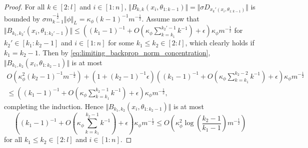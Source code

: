 \documentclass[twoside,11pt]{article}
\begin{document}
\begin{proof}
For all $k \in [2:l]$ and $i \in [1:n]$, $\Vert B_{k,k}(x_i,\theta_{1:k-1}) \Vert = \Vert \sigma D_{x_k'(x_i,\theta_{1:k-1})} \Vert$ is bounded by $\sigma m_{k-1}^{-\frac{1}{2}} \Vert \phi \Vert_L = \kappa_\phi (k-1)^{-1} m^{-\frac{1}{2}}$. Assume now that $\Vert B_{k_1,k_2'}(x_i,\theta_{1:k_2'-1}) \Vert \leq ((k_1-1)^{-1} + O(\kappa_\phi \sum_{k=k_1}^{k_2'-1} k^{-1}) + \epsilon) \kappa_\phi m^{-\frac{1}{2}}$ for $k_2' \in [k_1:k_2-1]$ and $i \in [1:n]$ for some $k_1 \leq k_2 \in [2:l]$, which clearly holds if $k_1=k_2-1$. Then by \eqref{eq:limiting_backprop_norm_concentration}, $\Vert B_{k_1,k_2}(x_i,\theta_{1:k_2-1}) \Vert$ is at most
\begin{multline*}
O(\kappa_\phi^2 (k_2-1)^{-1} m^{-\frac{1}{2}}) + (1 + (k_2-1)^{-1} \epsilon) \left( (k_1-1)^{-1} + O\left( \kappa_\phi \sum_{k=k_1}^{k_2-2} k^{-1} \right) + \epsilon \right) \kappa_\phi m^{-\frac{1}{2}} \\
\leq \left( (k_1-1)^{-1} + O\left( \kappa_\phi \sum_{k=k_1}^{k_2-1} k^{-1} \right) + \epsilon \right) \kappa_\phi m^{-\frac{1}{2}},
\end{multline*}
completing the induction. Hence $\Vert B_{k_1,k_2}(x_i,\theta_{1:k_2-1}) \Vert$ is at most
\[
\left( (k_1-1)^{-1} + O\left( \kappa_\phi \sum_{k=k_1}^{k_2-1} k^{-1} \right) + \epsilon \right) \kappa_\phi m^{-\frac{1}{2}}
\leq O\left( \kappa_\phi^2 \log\left( \frac{k_2-1}{k_1-1} \right) m^{-\frac{1}{2}} \right)
\]
for all $k_1 \leq k_2 \in [2:l]$ and $i \in [1:n]$.
\end{proof}
\end{document}
